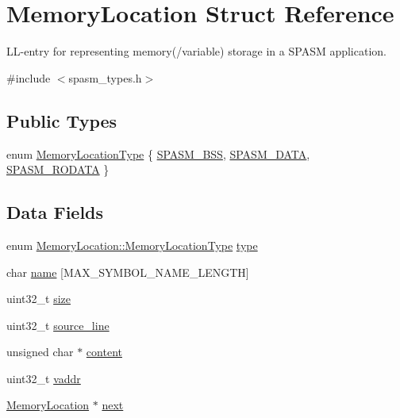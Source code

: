 \hypertarget{struct_memory_location}{
\section{\-Memory\-Location \-Struct \-Reference}
\label{struct_memory_location}
}


\-L\-L-\/entry for representing memory(/variable) storage in a \-S\-P\-A\-S\-M application.  




{\ttfamily \#include $<$spasm\-\_\-types.\-h$>$}

\subsection*{\-Public \-Types}
\begin{DoxyCompactItemize}
\item 
enum \hyperlink{struct_memory_location_a6eda5c2bf0e7027732edc83358dfd7e6}{\-Memory\-Location\-Type} \{ \hyperlink{struct_memory_location_a6eda5c2bf0e7027732edc83358dfd7e6a344a415da0c2a368585758b12ecd775b}{\-S\-P\-A\-S\-M\-\_\-\-B\-S\-S}, 
\hyperlink{struct_memory_location_a6eda5c2bf0e7027732edc83358dfd7e6a8c90ed4d7671818c53be02fe6b35ce90}{\-S\-P\-A\-S\-M\-\_\-\-D\-A\-T\-A}, 
\hyperlink{struct_memory_location_a6eda5c2bf0e7027732edc83358dfd7e6a0ffce35af6bc5cc8ca5970d8361ed226}{\-S\-P\-A\-S\-M\-\_\-\-R\-O\-D\-A\-T\-A}
 \}
\end{DoxyCompactItemize}
\subsection*{\-Data \-Fields}
\begin{DoxyCompactItemize}
\item 
enum \*
\hyperlink{struct_memory_location_a6eda5c2bf0e7027732edc83358dfd7e6}{\-Memory\-Location\-::\-Memory\-Location\-Type} \hyperlink{struct_memory_location_a2736152232b8c5033a0ec806877105db}{type}
\item 
char \hyperlink{struct_memory_location_a320c498b87917320483f1ad58fe686a6}{name} \mbox{[}\-M\-A\-X\-\_\-\-S\-Y\-M\-B\-O\-L\-\_\-\-N\-A\-M\-E\-\_\-\-L\-E\-N\-G\-T\-H\mbox{]}
\item 
uint32\-\_\-t \hyperlink{struct_memory_location_aa261f98a2bc22ff9dd6ce65415bdbe9e}{size}
\item 
uint32\-\_\-t \hyperlink{struct_memory_location_ad8776d9c07ac1dfafd46fc571800268a}{source\-\_\-line}
\item 
unsigned char $\ast$ \hyperlink{struct_memory_location_afef0e80245b6dadee968d5d3dc6e5c5c}{content}
\item 
uint32\-\_\-t \hyperlink{struct_memory_location_a925b7416925925d465bbbc162bb3bc4c}{vaddr}
\item 
\hyperlink{struct_memory_location}{\-Memory\-Location} $\ast$ \hyperlink{struct_memory_location_adacbfac647a59503828b699744046177}{next}
\end{DoxyCompactItemize}


